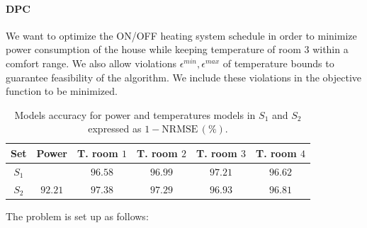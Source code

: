 \paragraph{DPC}
We want to optimize the ON/OFF heating system schedule in order to minimize power consumption of the house while keeping temperature of room $3$ within a comfort range. We also allow violations $\epsilon^{min},\epsilon^{max}$  of temperature bounds to guarantee feasibility of the algorithm. We include these violations in the objective function to be minimized.
\begin{table}[t!]
	\centering
	\begin{tabular}{cccccc}
		\toprule
		Set       & Power   & T. room $1$ & T. room $2$ & T. room $3$ & T. room $4$  \\ 
		\midrule
		$S_1$     &         & $96.58$     & $96.99$     & $97.21$     & $96.62$\\
		$S_2$     & $92.21$ & $97.38$     & $97.29$     & $96.93$     & $96.81$\\
		\bottomrule
	\end{tabular}
	\caption{Models accuracy for power and temperatures models in $S_1$ and $S_2$ expressed as $\mathrm{1-NRMSE}\,(\%)$.}
	\captionsetup{justification=centering}
	\label{T:S1accuracy}
	\vspace{-0.5cm}
\end{table}

The problem is set up as follows:

